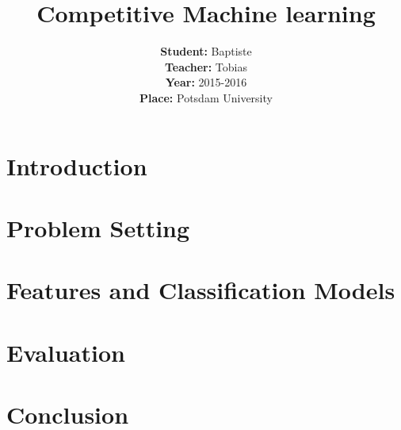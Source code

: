 \documentclass[12pt,twoside]{scrreprt}
\title{Competitive Machine learning}
\author{\textbf{Student:} Baptiste \bsc{O'Jeanson} \\
	\textbf{Teacher:} Tobias \bsc{Scheffer}\\
	\textbf{Year:} 2015-2016\\
	\textbf{Place:} Potsdam University\\}
\begin{document}

\tableofcontents

\chapter{Introduction}


\chapter{Problem Setting}


\chapter{Features and Classification Models}


\chapter{Evaluation}


\chapter{Conclusion}


%
\printbibliography
\end{document}
